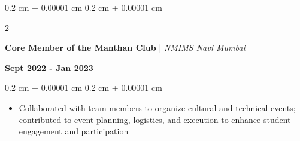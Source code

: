 \documentclass[10pt, letterpaper]{article}
\newenvironment{highlights}{
    \begin{itemize}[
        topsep=0.05 cm,
        parsep=0 cm,
        partopsep=0pt,
        itemsep=0pt,
        leftmargin=0.4 cm + 10pt
    ]
}{
    \end{itemize}
} %
\newenvironment{onecolentry}{
    \begin{adjustwidth}{
        0.2 cm + 0.00001 cm
    }{
        0.2 cm + 0.00001 cm
    }
}{
    \end{adjustwidth}
} %
\newenvironment{twocolentry}[2][]{
    \onecolentry
    \def\secondColumn{#2}
    \setcolumnwidth{\fill, 5.0 cm}
    \begin{paracol}{2}
}{
    \switchcolumn \raggedleft \secondColumn
    \end{paracol}
    \endonecolentry
} %
\begin{document}
\vspace{0.2 cm}

\begin{twocolentry}{
    \textbf{Sept 2022 - Jan 2023}}
    \textbf{Core Member of the Manthan Club} | \textit{NMIMS Navi Mumbai}
\end{twocolentry}

\vspace{0.10 cm}
\begin{onecolentry}
    \begin{highlights}
        \item Collaborated with team members to organize cultural and technical events; contributed to event planning, logistics, and execution to enhance student engagement and participation
    \end{highlights}
\end{onecolentry}
        
\end{document}
